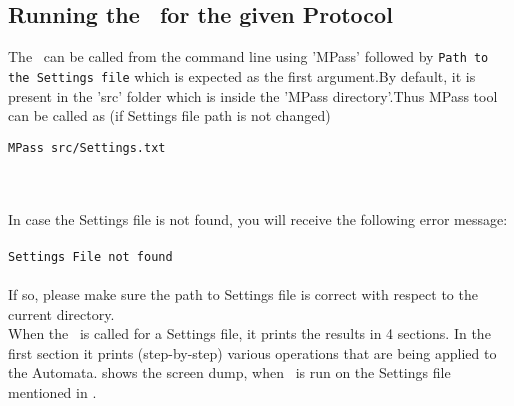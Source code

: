 \subsection{Running the \MPass\ for the given Protocol}
The \MPass\ can be called from the command line using 'MPass' followed by {\tt Path to the Settings file} which is expected as the first argument.By default, it is present in the 'src' folder which is inside the 'MPass directory'.Thus MPass tool can be called as (if Settings file path is not changed)
\begin{verbatim}
MPass src/Settings.txt
\end{verbatim}\\\\
In case the Settings file is not found, you will receive the following error message:\\\\
{\tt Settings File not found\\}
\\
If so, please make sure the path to Settings file is correct with respect to the current directory.\\
When the \MPass\ is called for a Settings file, it prints the results in 4 sections. In the first section it prints (step-by-step) various operations that are being applied to the Automata.
 shows the screen dump, when \MPass\ is run on the Settings file mentioned in .\\
